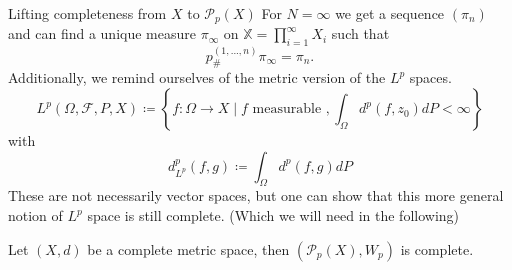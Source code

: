 \documentclass[10pt]{beamer}
\begin{document}
\begin{frame}{Lifting completeness from $X$ to $\mathcal{P}_p(X)$}
    For $N=\infty$ we get a sequence $(\pi_n)$ and can find a unique measure $\pi_\infty$ on $\mathbb{X} = \prod_{i = 1}^\infty X_i$ such that $$p^{(1,...,n)}_{\#} \pi_\infty = \pi_n.$$
    Additionally, we remind ourselves of the metric version of the $L^p$ spaces. 
        $$L^p(\Omega,\mathcal{F}, P, X) \coloneqq \left\{ f : \Omega \rightarrow X \mid f \text{ measurable }, \int_\Omega d^p(f,z_0) d P < \infty \right\}$$ with$$d_{L^p}^p(f,g) \coloneqq \int_\Omega d^p(f,g) dP$$
        These are not necessarily vector spaces, but one can show that this more general notion of $L^p$ space is still complete. (Which we will need in the following)
    \begin{theorem}
        Let $(X,d)$ be a complete metric space, then $(\mathcal{P}_p(X), W_p)$ is complete.
    \end{theorem}
\end{frame}


\end{document}
